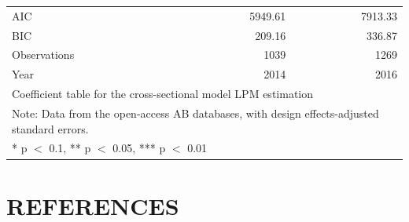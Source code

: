 \documentclass[floatsintext,man]{apa7}\usepackage[]{graphicx}\usepackage[]{color}
\begin{document}
\begin{longtable}[t]{lrr}
\midrule
AIC & \num{5949.61} & \num{7913.33}\\
BIC & \num{209.16} & \num{336.87}\\
Observations & 1039 & 1269\\
Year & 2014 & 2016\\
\bottomrule
\multicolumn{3}{l}{\rule{0pt}{1em}Coefficient table for the cross-sectional model LPM estimation}\\
\multicolumn{3}{l}{\rule{0pt}{1em}Note: Data from the open-access AB databases, with design effects-adjusted standard errors.}\\
\multicolumn{3}{l}{\rule{0pt}{1em}* p $<$ 0.1, ** p $<$ 0.05, *** p $<$ 0.01}\\
\end{longtable}



\clearpage
\section{REFERENCES}
\printbibliography[heading = none]
\clearpage
\end{document}
